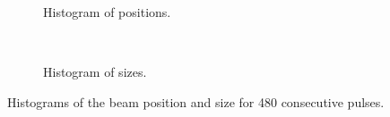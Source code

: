\begin{figure}[!ht]
  \begin{subfigure}[t]{0.5\textwidth}
    
    \caption{Histogram of positions.}
    \label{}
  \end{subfigure}
  ~
  \begin{subfigure}[t]{0.5\textwidth}
    
    \caption{Histogram of sizes.}
    \label{}
  \end{subfigure}
  \caption[Histograms of the beam positions and sizes for 480 consecutive pulses]{Histograms of the beam position and size for 480 consecutive pulses.}
  \label{chap4:hist_variation}
\end{figure}
